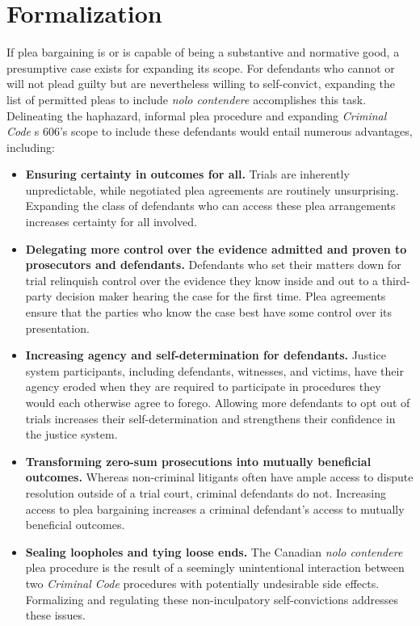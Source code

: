 \section{Formalization}

If plea bargaining is or is capable of being a substantive and normative good, a presumptive case exists for expanding its scope. For defendants who cannot or will not plead guilty but are nevertheless willing to self-convict, expanding the list of permitted pleas to include \textit{nolo contendere} accomplishes this task. Delineating the haphazard, informal plea procedure and expanding \textit{Criminal Code} s 606's scope to include these defendants would entail numerous advantages, including:

\begin{itemize}
    \item \textbf{Ensuring certainty in outcomes for all.} Trials are inherently unpredictable, while negotiated plea agreements are routinely unsurprising. Expanding the class of defendants who can access these plea arrangements increases certainty for all involved.
    \item \textbf{Delegating more control over the evidence admitted and proven to prosecutors and defendants.} Defendants who set their matters down for trial relinquish control over the evidence they know inside and out to a third-party decision maker hearing the case for the first time. Plea agreements ensure that the parties who know the case best have some control over its presentation.
    \item \textbf{Increasing agency and self-determination for defendants.} Justice system participants, including defendants, witnesses, and victims, have their agency eroded when they are required to participate in procedures they would each otherwise agree to forego. Allowing more defendants to opt out of trials increases their self-determination and strengthens their confidence in the justice system.
    \item \textbf{Transforming zero-sum prosecutions into mutually beneficial outcomes.} Whereas non-criminal litigants often have ample access to dispute resolution outside of a trial court, criminal defendants do not. Increasing access to plea bargaining increases a criminal defendant's access to mutually beneficial outcomes. 
    \item \textbf{Sealing loopholes and tying loose ends.} The Canadian \textit{nolo contendere} plea procedure is the result of a seemingly unintentional interaction between two \textit{Criminal Code} procedures with potentially undesirable side effects. Formalizing and regulating these non-inculpatory self-convictions addresses these issues.
\end{itemize}


